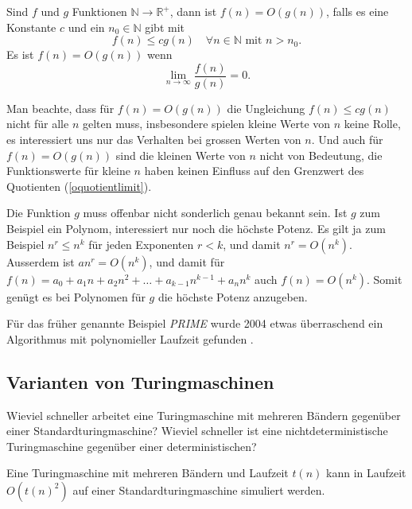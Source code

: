 \begin{definition}
Sind $f$ und $g$ Funktionen $\mathbb N\to\mathbb R^+$, dann ist
$f(n)=O(g(n))$, falls es eine Konstante $c$ und ein $n_0\in\mathbb N$
gibt mit
\[
f(n)\le cg(n)\quad \forall n\in\mathbb N\text{ mit } n > n_0.
\]
Es ist $f(n)=O(g(n))$ wenn 
\begin{equation}
\lim_{n\to\infty}\frac{f(n)}{g(n)}=0.
\label{oquotientlimit}
\end{equation}
\end{definition}
Man beachte, dass für $f(n)=O(g(n))$ die Ungleichung $f(n)\le
cg(n)$ nicht für alle $n$ gelten muss, insbesondere spielen kleine
Werte von $n$ keine Rolle, es interessiert uns nur das Verhalten
bei grossen Werten von $n$.
Und auch für $f(n)=O(g(n))$ sind die kleinen Werte von $n$ nicht
von Bedeutung, die Funktionswerte für kleine $n$ haben keinen
Einfluss auf den Grenzwert des Quotienten (\ref{oquotientlimit}).

Die Funktion $g$ muss offenbar nicht sonderlich genau bekannt
sein. Ist $g$ zum Beispiel ein Polynom, interessiert nur noch
die höchste Potenz. Es gilt ja zum Beispiel
$ n^r\le n^k $ für jeden Exponenten $r<k$, und damit
$n^r=O(n^k)$. Ausserdem ist $an^r=O(n^k)$, und damit
für $f(n)=a_0+a_1n+a_2n^2+\dots+a_{k-1}n^{k-1}+a_nn^k$ auch
$ f(n)=O(n^k) $. Somit genügt es bei Polynomen für $g$ die
höchste Potenz anzugeben.

\begin{beispiel}
Für das früher genannte Beispiel \textsl{PRIME} wurde 2004 etwas
überraschend ein Algorithmus mit
polynomieller Laufzeit gefunden \cite{skript:aks}.
\end{beispiel}

\subsection{Varianten von Turingmaschinen}
Wieviel schneller arbeitet eine Turingmaschine mit mehreren Bändern 
gegenüber einer Standardturingmaschine? Wieviel schneller ist eine
nichtdeterministische Turingmaschine gegenüber einer deterministischen?

\begin{satz}
Eine Turingmaschine mit mehreren Bändern und Laufzeit $t(n)$ kann
in Laufzeit $O(t(n)^2)$ auf einer Standardturingmaschine
simuliert werden.
\end{satz}

